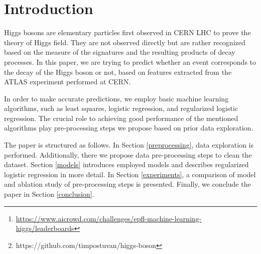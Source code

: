 


\begin{abstract}

Machine learning approaches have become an indispensable part of numerous research fields, providing predictions and explanations of complex multidimensional datasets. In this paper, we focus on developing an approach for detecting whether an event corresponds to the decay of the Higgs boson or not, based on features extracted from the ATLAS experiment performed at CERN. Our best approach uses regularized logistic regression with splitting on the number of jets, feature expansion, median imputing, and outlier bounding. It achieves $0.831\%$ accuracy on the Higgs boson machine learning challenge at AIcrowd platform.\footnote{\hyperlink{AIcrowd}{https://www.aicrowd.com/challenges/epfl-machine-learning-higgs/leaderboards}} The source code of this project is available on GitHub.\footnote{https://github.com/timpostuvan/higgs-boson}

\end{abstract}


\section{Introduction}

Higgs bosons are elementary particles first observed in CERN LHC to prove the theory of Higgs field. They are not observed directly but are rather recognized based on the measure of the signatures and the resulting products of decay processes. In this paper, we are trying to predict whether an event corresponds to the decay of the Higgs boson or not, based on features extracted from the ATLAS experiment performed at CERN.

In order to make accurate predictions, we employ basic machine learning algorithms, such as least squares, logistic regression, and regularized logistic regression. The crucial role to achieving good performance of the mentioned algorithms play pre-processing steps we propose based on prior data exploration.

The paper is structured as follows. In Section \ref{preprocessing}, data exploration is performed. Additionally, there we propose data pre-processing steps to clean the dataset. Section \ref{models} introduces employed models and describes regularized logistic regression in more detail. In Section \ref{experiments}, a comparison of model and ablation study of pre-processing steps is presented. Finally, we conclude the paper in Section \ref{conclusion}. 








